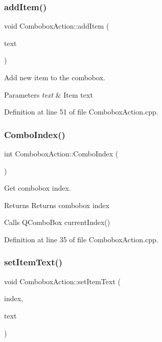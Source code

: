 \subsubsection{\texorpdfstring{add\+Item()}{addItem()}}
{\footnotesize\ttfamily void Combobox\+Action\+::add\+Item (\begin{DoxyParamCaption}\item[{const Q\+String}]{text }\end{DoxyParamCaption})}



Add new item to the combobox. 


\begin{DoxyParams}{Parameters}
{\em text} & Item text \\
\hline
\end{DoxyParams}


Definition at line 51 of file Combobox\+Action.\+cpp.

\mbox{\label{classComboboxAction_adfe475154e5b88eddbc9a51759bdf312}} 
\subsubsection{\texorpdfstring{Combo\+Index()}{ComboIndex()}}
{\footnotesize\ttfamily int Combobox\+Action\+::\+Combo\+Index (\begin{DoxyParamCaption}{ }\end{DoxyParamCaption})}



Get combobox index. 

\begin{DoxyReturn}{Returns}
Returns combobox index
\end{DoxyReturn}
Calls Q\+Combo\+Box current\+Index() 

Definition at line 35 of file Combobox\+Action.\+cpp.

\mbox{\label{classComboboxAction_ac216fa96660ef568af946eb2fc58746e}} 
\subsubsection{\texorpdfstring{set\+Item\+Text()}{setItemText()}}
{\footnotesize\ttfamily void Combobox\+Action\+::set\+Item\+Text (\begin{DoxyParamCaption}\item[{int}]{index,  }\item[{const Q\+String}]{text }\end{DoxyParamCaption})}



